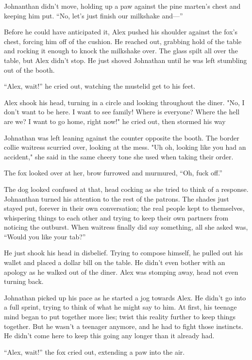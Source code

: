 Johnanthan didn't move, holding up a paw against the pine marten's chest
and keeping him put. ``No, let's just finish our milkshake and---''

Before he could have anticipated it, Alex pushed his shoulder against
the fox's chest, forcing him off of the cushion. He reached out,
grabbing hold of the table and rocking it enough to knock the milkshake
over. The glass spilt all over the table, but Alex didn't stop. He just
shoved Johnathan until he was left stumbling out of the booth.

``Alex, wait!'' he cried out, watching the mustelid get to his feet.

Alex shook his head, turning in a circle and looking throughout the
diner. "No, I don't want to be here. I want to see family! Where is
everyone? Where the hell are we? I want to go home, right now!" he cried
out, then stormed his way

Johnathan was left leaning against the counter opposite the booth. The
border collie waitress scurried over, looking at the mess. "Uh oh,
looking like you had an accident," she said in the same cheery tone she
used when taking their order.

The fox looked over at her, brow furrowed and murmured, ``Oh, fuck off.''

The dog looked confused at that, head cocking as she tried to think of a
response. Johnanthan turned his attention to the rest of the patrons.
The shades just stayed put, forever in their own conversation; the real
people kept to themselves, whispering things to each other and trying to
keep their own partners from noticing the outburst. When waitress
finally did say something, all she asked was, ``Would you like your tab?''

He just shook his head in disbelief. Trying to compose himself, he
pulled out his wallet and placed a dollar bill on the table. He didn't
even bother with an apology as he walked out of the diner. Alex was
stomping away, head not even turning back.

Johnathan picked up his pace as he started a jog towards Alex. He didn't
go into a full sprint, trying to think of what he might say to him. At
first, his teenage mind began to put together more lies; twist this
reality further to keep things together. But he wasn't a teenager
anymore, and he had to fight those instincts. He didn't come here to
keep this going any longer than it already had.

``Alex, wait!'' the fox cried out, extending a paw into the air.

